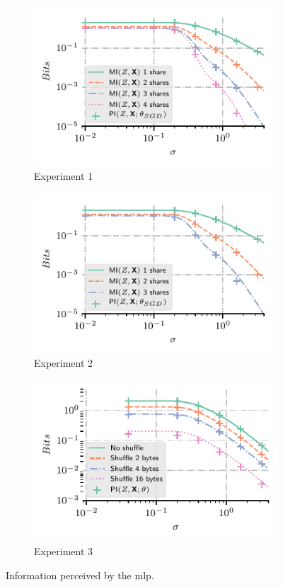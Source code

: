 \begin{figure}
    \centering
    \begin{subfigure}{0.49\textwidth}
        \includegraphics{Figures/simus/MI_bool_exp1_05}
        \caption{Experiment 1}
        \label{fig:exp_MI_1}
    \end{subfigure}
    \begin{subfigure}{0.49\textwidth}
        \includegraphics{Figures/simus/MI_bool_exp2_05}
        \caption{Experiment 2}
        \label{fig:exp_MI_2}
    \end{subfigure}
    \begin{subfigure}{0.49\textwidth}
        \includegraphics{Figures/simus/shuffle_simus}
        \caption{Experiment 3}
        \label{fig:exp_MI_3}
    \end{subfigure}
	\caption{Information perceived by the \gls{mlp}.}
	\label{fig:exp_MI}
\end{figure}


